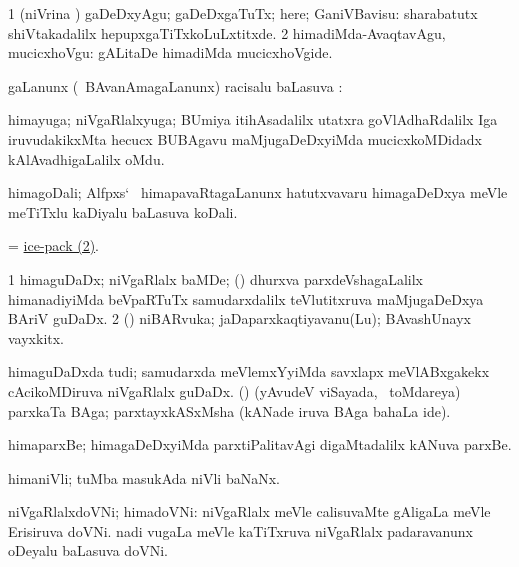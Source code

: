 \noindent
\gl{\akirx}
\bmng
\bnum
\num{1} (niVrina \vi) gaDeDxyAgu; gaDeDxgaTuTx; here; GaniVBavisu:  sharabatutx shiVtakadalilx hepupxgaTiTxkoLuLxtitxde. 
\num{2} himadiMda-AvaqtavAgu, mucicxhoVgu:  gALitaDe himadiMda mucicxhoVgide. 
\enum
\emng
\eentry

\bentry
{}
\gl{\uparx}
\bmng
\nA gaLanunx (\kanmu\ BAvanAmagaLanunx) racisalu baLasuva \uparx:  
\emng
\eentry

\bentry
{}
\gl{\nA}
\bmng
himayuga; niVgaRlalxyuga; BUmiya itihAsadalilx utatxra goVlAdhaRdalilx Iga iruvudakikxMta hecucx BUBAgavu maMjugaDeDxyiMda mucicxkoMDidadx kAlAvadhigaLalilx oMdu. 
\emng
\eentry

\bentry
{}
\gl{\nA}
\bmng
himagoDali; Alfpxs` \mo\ himapavaRtagaLanunx hatutxvavaru himagaDeDxya meVle meTiTxlu kaDiyalu baLasuva koDali.  
\emng
\eentry

\bentry
{}
\gl{\nA}
\bmng
 = \hyperlink{ice-pack(2)}{ice-pack (2)}. 
\emng
\eentry

\bentry
{}
\gl{\nA}
\bmng
\bnum
\num{1} himaguDaDx; niVgaRlalx baMDe; (\sA) dhurxva parxdeVshagaLalilx himanadiyiMda beVpaRTuTx samudarxdalilx teVlutitxruva maMjugaDeDxya BAriV guDaDx.   
\num{2} (\rUpa) niBARvuka; jaDaparxkaqtiyavanu(Lu); BAvashUnayx vayxkitx. 
\enum
\emng

\noindent
\gl{\pagu}
\bmng
{}  
\banum
{} himaguDaDxda tudi; samudarxda meVlemxYyiMda savxlapx meVlABxgakekx cAcikoMDiruva niVgaRlalx guDaDx. 
 (\rUpa) (yAvudeV viSayada, \kanmu\ toMdareya) parxkaTa BAga; parxtayxkASxMsha (kANade iruva BAga bahaLa ide). 
\eanum
\emng
\eentry

\bentry
{}
\gl{\nA}
\bmng
himaparxBe; himagaDeDxyiMda parxtiPalitavAgi digaMtadalilx kANuva parxBe. 
\emng
\eentry

\bentry
{}
\gl{\nA}
\bmng
himaniVli; tuMba masukAda niVli baNaNx. 
\emng
\eentry

\bentry
{}
\gl{\nA}
\bmng
niVgaRlalxdoVNi; himadoVNi: 
\banum
{} niVgaRlalx meVle calisuvaMte gAligaLa meVle Erisiruva doVNi. 
\hypertarget{ice-boat(b)}{} 
 nadi \mo vugaLa meVle kaTiTxruva niVgaRlalx padaravanunx oDeyalu baLasuva doVNi. 
\eanum
\emng
\eentry

